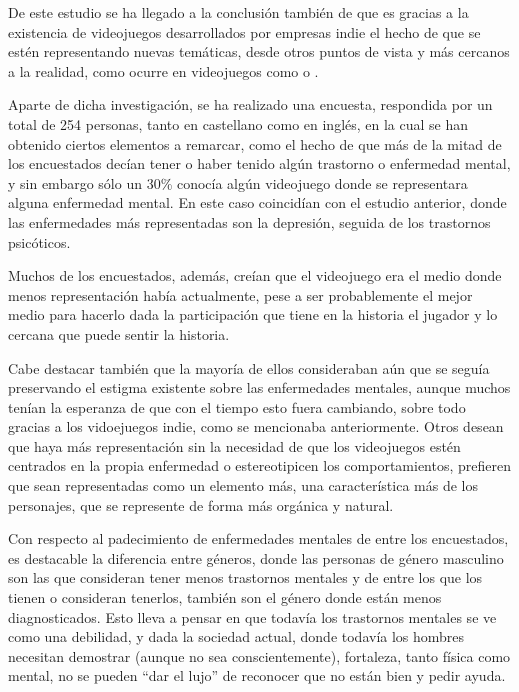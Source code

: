 \documentclass[12pt, a4paper,twoside,titlepage]{book}
\begin{document}
De este estudio se ha llegado a la conclusión también de que es gracias a la existencia de videojuegos desarrollados por empresas indie el hecho de que se estén representando nuevas temáticas, desde otros puntos de vista y más cercanos a la realidad, como ocurre en videojuegos como  o . 

Aparte de dicha investigación, se ha realizado una encuesta, respondida por un total de 254 personas, tanto en castellano como en inglés, en la cual se han obtenido ciertos elementos a remarcar, como el hecho de que más de la mitad de los encuestados decían tener o haber tenido algún trastorno o enfermedad mental, y sin embargo sólo un 30\% conocía algún videojuego donde se representara alguna enfermedad mental. En este caso coincidían con el estudio anterior, donde las enfermedades más representadas son la depresión, seguida de los trastornos psicóticos.

Muchos de los encuestados, además, creían que el videojuego era el medio donde menos representación había actualmente, pese a ser probablemente el mejor medio para hacerlo dada la participación que tiene en la historia el jugador y lo cercana que puede sentir la historia. 

Cabe destacar también que la mayoría de ellos consideraban aún que se seguía preservando el estigma existente sobre las enfermedades mentales, aunque muchos tenían la esperanza de que con el tiempo esto fuera cambiando, sobre todo gracias a los vidoejuegos indie, como se mencionaba anteriormente. Otros desean que haya más representación sin la necesidad de que los videojuegos estén centrados en la propia enfermedad o estereotipicen los comportamientos, prefieren que sean representadas como un elemento más, una característica más de los personajes, que se represente de forma más orgánica y natural. 

Con respecto al padecimiento de enfermedades mentales de entre los encuestados, es destacable la diferencia entre géneros, donde las personas de género masculino son las que consideran tener menos trastornos mentales y de entre los que los tienen o consideran tenerlos, también son el género donde están menos diagnosticados. Esto lleva a pensar en que todavía los trastornos mentales se ve como una debilidad, y dada la sociedad actual, donde todavía los hombres necesitan demostrar (aunque no sea conscientemente), fortaleza, tanto física como mental, no se pueden ``dar el lujo'' de reconocer que no están bien y pedir ayuda. 
\end{document}
